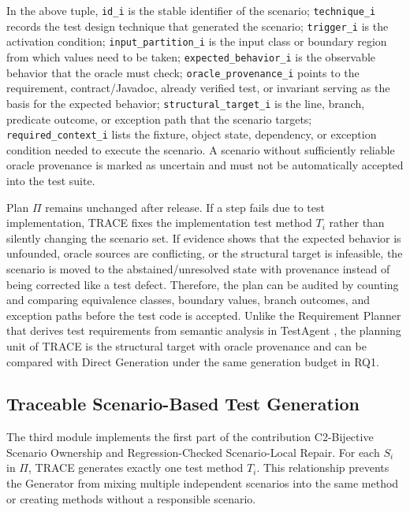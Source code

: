 \documentclass[pdflatex,sn-basic,Numbered,iicol]{sn-jnl}
\begin{document}
In the above tuple, \texttt{id\_i} is the stable identifier of the scenario; \texttt{technique\_i} records the test design technique that generated the scenario; \texttt{trigger\_i} is the activation condition; \texttt{input\_partition\_i} is the input class or boundary region from which values need to be taken; \texttt{expected\_behavior\_i} is the observable behavior that the oracle must check; \texttt{oracle\_provenance\_i} points to the requirement, contract/Javadoc, already verified test, or invariant serving as the basis for the expected behavior; \texttt{structural\_target\_i} is the line, branch, predicate outcome, or exception path that the scenario targets; \texttt{required\_context\_i} lists the fixture, object state, dependency, or exception condition needed to execute the scenario. A scenario without sufficiently reliable oracle provenance is marked as uncertain and must not be automatically accepted into the test suite.

Plan \ensuremath{\Pi} remains unchanged after release. If a step fails due to test implementation, TRACE fixes the implementation test method $T_i$ rather than silently changing the scenario set. If evidence shows that the expected behavior is unfounded, oracle sources are conflicting, or the structural target is infeasible, the scenario is moved to the abstained/unresolved state with provenance instead of being corrected like a test defect. Therefore, the plan can be audited by counting and comparing equivalence classes, boundary values, branch outcomes, and exception paths before the test code is accepted. Unlike the Requirement Planner that derives test requirements from semantic analysis in TestAgent \cite{bib23}, the planning unit of TRACE is the structural target with oracle provenance and can be compared with Direct Generation under the same generation budget in RQ1.

\subsection{Traceable Scenario-Based Test Generation}\label{subsec:traceable-generation}

The third module implements the first part of the contribution C2-Bijective Scenario Ownership and Regression-Checked Scenario-Local Repair. For each $S_i$ in \ensuremath{\Pi}, TRACE generates exactly one test method $T_i$. This relationship prevents the Generator from mixing multiple independent scenarios into the same method or creating methods without a responsible scenario.
\end{document}
